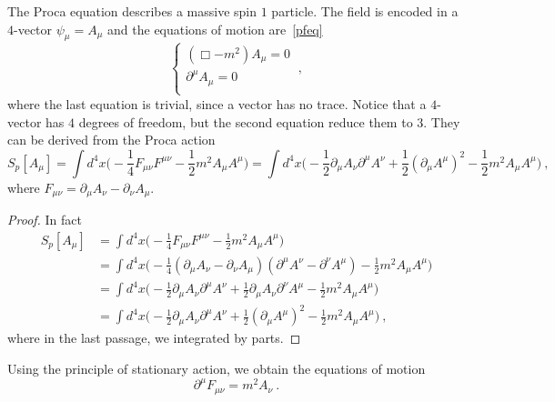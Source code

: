     The Proca equation describes a massive spin $1$ particle. The field is encoded in a $4$-vector $\psi_\mu = A_\mu$ and the equations of motion are~\eqref{pfeq}
    \begin{equation}\label{proca}
        \begin{cases}
            (\Box - m^2) A_\mu = 0 \\
            \partial^\mu A_\mu = 0 \\
        \end{cases} ~,
    \end{equation}
    where the last equation is trivial, since a vector has no trace. Notice that a $4$-vector has $4$ degrees of freedom, but the second equation reduce them to $3$. They can be derived from the Proca action 
    \begin{equation*}
        S_p [A_\mu] = \int d^4 x \Big ( - \frac{1}{4} F_{\mu\nu} F^{\mu\nu} - \frac{1}{2} m^2 A_\mu A^\mu \Big) = \int d^4 x \Big ( -\frac{1}{2} \partial_\mu A_\nu \partial^\mu A^\nu + \frac{1}{2} (\partial_\mu A^\mu)^2 - \frac{1}{2} m^2 A_\mu A^\mu \Big) ~,
    \end{equation*}
    where $F_{\mu\nu} = \partial_\mu A_\nu - \partial_\nu A_\mu$.
    \begin{proof}
        In fact 
        \begin{equation*}
        \begin{aligned}
            S_p [A_\mu] & = \int d^4 x \Big ( - \frac{1}{4} F_{\mu\nu} F^{\mu\nu} - \frac{1}{2} m^2 A_\mu A^\mu \Big) \\ & = \int d^4 x \Big ( - \frac{1}{4} (\partial_\mu A_\nu - \partial_\nu A_\mu)(\partial^\mu A^\nu - \partial^\nu A^\mu) - \frac{1}{2} m^2 A_\mu A^\mu \Big) \\ & = \int d^4 x \Big ( - \frac{1}{2} \partial_\mu A_\nu \partial^\mu A^\nu + \frac{1}{2} \partial_\mu A_\nu \partial^\nu A^\mu - \frac{1}{2} m^2 A_\mu A^\mu \Big ) \\ & = \int d^4 x \Big ( -\frac{1}{2} \partial_\mu A_\nu \partial^\mu A^\nu + \frac{1}{2} (\partial_\mu A^\mu)^2 - \frac{1}{2} m^2 A_\mu A^\mu \Big) ~,
        \end{aligned}
        \end{equation*}
        where in the last passage, we integrated by parts.
    \end{proof}  
    Using the principle of stationary action, we obtain the equations of motion 
    \begin{equation*}
        \partial^\mu F_{\mu\nu} = m^2 A_\nu ~.
    \end{equation*}
